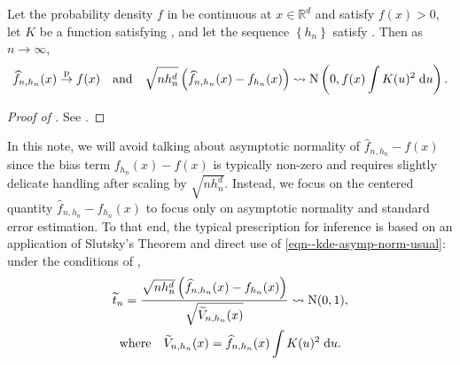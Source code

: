 \begin{theorem}
\label{thm--kde-asymp-norm-usual}
Let the probability density \(f\) in  be continuous at \(x
\in \mathbb{R}^{d}\) and satisfy \(f (x) > 0\), let \(K\) be a function
satisfying , and let the sequence \(\left\{ h_{n} \right\}\)
satisfy .
Then as \(n \to \infty\),
\begin{equation}
  \widehat{f}_{n, h_{n}} (x) \overset{\mathrm{p}}{\to} f (x) \quad \text{and}
  \quad
  \sqrt{n h_{n}^{d}} \left( \widehat{f}_{n, h_{n}} (x) - f_{h_{n}} (x) \right)
  \rightsquigarrow \mathrm{N} \left( 0, f (x) \int K (u)^{2} \; \mathrm{d} u \right).
  \label{eqn--kde-asymp-norm-usual}
\end{equation}
\end{theorem}

\begin{proof}[Proof of ]
See .
\end{proof}


In this note, we will avoid talking about asymptotic normality of
\(\widehat{f}_{n, h_{n}} - f (x)\) since the bias term \(f_{h_{n}} (x) - f (x)\)
is typically non-zero and requires slightly delicate handling after scaling by
\(\sqrt{n h_{n}^{d}}\).
Instead, we focus on the centered quantity \(\widehat{f}_{n, h_{n}} - f_{h_{n}}
(x)\) to focus only on asymptotic normality and standard error estimation.
To that end, the typical prescription for inference is based on an application
of Slutsky's Theorem and direct use of \eqref{eqn--kde-asymp-norm-usual}: under
the conditions of ,
\begin{equation}
  \begin{gathered}
    \widetilde{t}_{n} = \frac{\sqrt{n h_{n}^{d}}\left( \widehat{f}_{n, h_{n}}
    (x) - f_{h_{n}} (x) \right)}{\sqrt{\widetilde{V}_{n, h_{n}} (x)}}
    \rightsquigarrow \mathrm{N} (0, 1), \\
    \text{where} \quad \widetilde{V}_{n, h_{n}} (x) = \widehat{f}_{n, h_{n}} (x)
    \int K (u)^{2} \; \mathrm{d} u.
  \end{gathered}
  \label{eqn--kde-asymp-norm-tstat-usual}
\end{equation}

